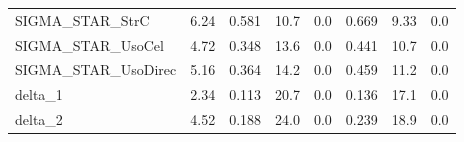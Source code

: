 \begin{tabular}{lrrrrrrr}
SIGMA\_STAR\_StrC     &    6.24 &    0.581 &    10.7 &      0.0 &         0.669 &         9.33 &           0.0 \\
SIGMA\_STAR\_UsoCel   &    4.72 &    0.348 &    13.6 &      0.0 &         0.441 &         10.7 &           0.0 \\
SIGMA\_STAR\_UsoDirec &    5.16 &    0.364 &    14.2 &      0.0 &         0.459 &         11.2 &           0.0 \\
delta\_1             &    2.34 &    0.113 &    20.7 &      0.0 &         0.136 &         17.1 &           0.0 \\
delta\_2             &    4.52 &    0.188 &    24.0 &      0.0 &         0.239 &         18.9 &           0.0 \\
\bottomrule
\end{tabular}

